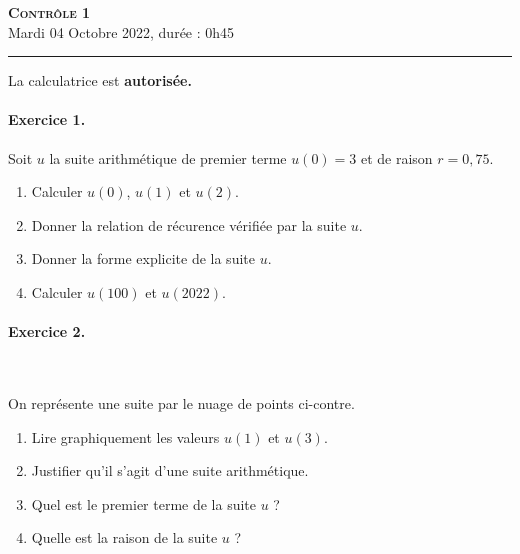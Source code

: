 \documentclass[11pt]{article}
\begin{document}

\begin{center}
\textbf{\LARGE \textsc{Contrôle 1}}\\[2mm]

{\large Mardi 04 Octobre 2022, durée : 0h45}\\[1mm]
\noindent\rule{12cm}{0.4pt}
\end{center}
La calculatrice est \textbf{autorisée.}

\paragraph{Exercice 1.} Soit $u$ la suite arithmétique de premier terme $u(0)=3$
et de raison $r=0,75$.
\begin{enumerate}
  \item Calculer $u(0)$, $u(1)$ et $u(2)$.
  \item Donner la relation de récurence vérifiée par la suite $u$.
  \item Donner la forme explicite de la suite $u$.
  \item Calculer $u(100)$ et $u(2022)$.
\end{enumerate}

\paragraph{Exercice 2.}~\\
\begin{minipage}{.5\textwidth}
  On représente une suite par le nuage de points ci-contre.
  \begin{enumerate}
    \item Lire graphiquement les valeurs $u(1)$ et $u(3)$.
    \item Justifier qu'il s'agit d'une suite arithmétique.
    \item Quel est le premier terme de la suite $u$ ?
    \item Quelle est la raison de la suite $u$ ?
  \end{enumerate}
\end{minipage}
\begin{minipage}{.5\textwidth}
\begin{center}
\end{center}
\end{minipage}
\end{document}

